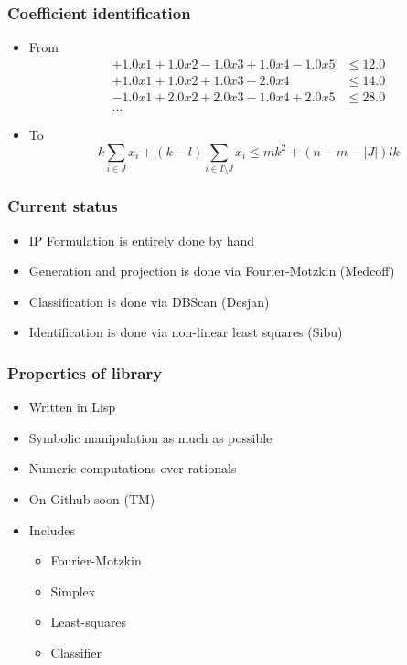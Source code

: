 \documentclass{beamer}
\begin{document}
\begin{frame}
  \frametitle{Coefficient identification}
  \begin{itemize}
  \item<1-> From
    \begin{align*}
      +1.0 x1   +1.0 x2   -1.0 x3   +1.0 x4   -1.0 x5   &\le 12.0\\
      +1.0 x1   +1.0 x2   +1.0 x3   -2.0 x4   &\le 14.0 \\
      -1.0 x1   +2.0 x2   +2.0 x3   -1.0 x4   +2.0 x5   &\le 28.0 \\
      \ldots
    \end{align*}
  \item<2-> To
    \begin{displaymath}
      k\sum_{i\in J} x_i +(k-l) \sum_{i\in I\setminus J} x_i \le mk^2+(n-m-|J|)lk
    \end{displaymath}
  \end{itemize}
\end{frame}

\begin{frame}
  \frametitle{Current status}
  \begin{itemize}
  \item<1-> IP Formulation is entirely done by hand
  \item<2-> Generation and projection is done via Fourier-Motzkin (Medcoff)
  \item<3-> Classification is done via DBScan (Desjan)
  \item<4-> Identification is done via non-linear least squares (Sibu)
  \end{itemize}
\end{frame}

\begin{frame}
  \frametitle{Properties of library}
  \begin{itemize}
  \item<1-> Written in Lisp
  \item<2-> Symbolic manipulation as much as possible
  \item<3-> Numeric computations over rationals
  \item<4-> On Github soon (TM)
  \item<5-> Includes
    \begin{itemize}
    \item Fourier-Motzkin
    \item Simplex
    \item Least-squares
    \item Classifier
    \end{itemize}
  \end{itemize}
\end{frame}
\end{document}
